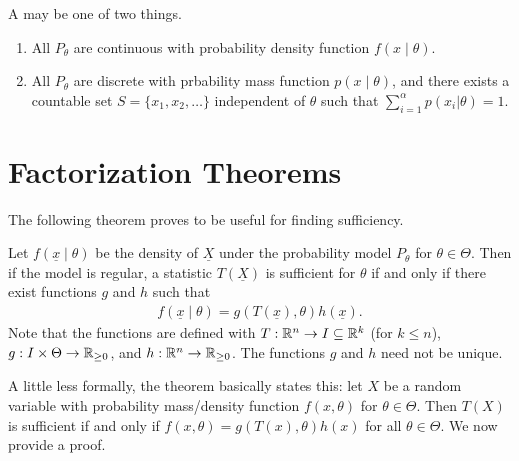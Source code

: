 \begin{definition}
    A  may be one of two things.
    \begin{enumerate}
        \item All $P_{\theta}$ are continuous with probability density function $f(x \mid \theta)$.
        \item All $P_{\theta}$ are discrete with prbability mass function $p(x \mid \theta)$, and there exists a countable set $S = \{x_{1},x_{2},\ldots\}$ independent of $\theta$ such that $\sum_{i=1}^{\alpha} p(x_{i} | \theta) = 1$.
    \end{enumerate}
\end{definition}


\section{Factorization Theorems}
The following theorem proves to be useful for finding sufficiency.
\begin{theorem}
    Let $f(\underline{x}\mid \theta)$ be the density of $\underline{X}$ under the probability model $P_{\theta}$ for $\theta \in \Theta$. Then if the model is regular, a statistic $T(\underline{X})$ is sufficient for $\theta$ if and only if there exist functions $g$ and $h$ such that
    \begin{align}
        f(\underline{x} \mid \theta) = g(T(\underline{x}), \theta) h(\underline{x}).
    \end{align}
    Note that the functions are defined with $T:\mathbb{R}^{n} \to I \subseteq \mathbb{R}^{k}$ (for $k \leq n$), $g:I \times \Theta \to \mathbb{R}_{\geq 0}$, and $h:\mathbb{R}^{n} \to \mathbb{R}_{\geq 0}$. The functions $g$ and $h$ need not be unique.
\end{theorem}
A little less formally, the theorem basically states this: let $X$ be a random variable with probability mass/density function $f(x,\theta)$ for $\theta \in \Theta$. Then $T(X)$ is sufficient if and only if $f(x,\theta) = g(T(x),\theta)h(x)$ for all $\theta \in \Theta$. We now provide a proof.

